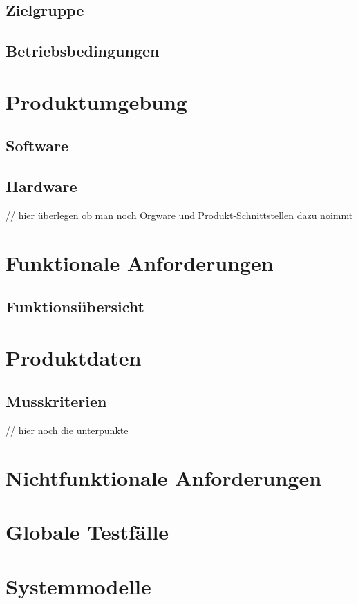 \documentclass[parskip=full]{scrartcl}
\begin{document}
\subsection{Zielgruppe}

\subsection{Betriebsbedingungen}

\section{Produktumgebung}

\subsection{Software}

\subsection{Hardware}
// hier überlegen ob man noch Orgware und Produkt-Schnittstellen dazu noimmt
\section{Funktionale Anforderungen}

\subsection{Funktionsübersicht}

\section{Produktdaten}

\subsection{Musskriterien} // hier noch die unterpunkte

\section{Nichtfunktionale Anforderungen}

\section{Globale Testfälle}

\section{Systemmodelle}
\end{document}
